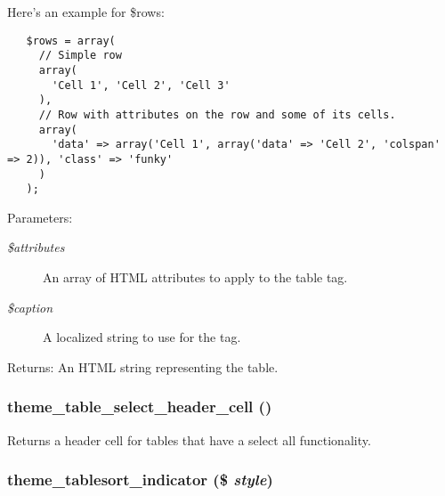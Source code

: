 Here's an example for \$rows: 

\begin{Code}\begin{verbatim}   $rows = array(
     // Simple row
     array(
       'Cell 1', 'Cell 2', 'Cell 3'
     ),
     // Row with attributes on the row and some of its cells.
     array(
       'data' => array('Cell 1', array('data' => 'Cell 2', 'colspan' => 2)), 'class' => 'funky'
     )
   );
\end{verbatim}
\end{Code}



\begin{Desc}
\item[Parameters:]
\begin{description}
\item[{\em \$attributes}]An array of HTML attributes to apply to the table tag. \item[{\em \$caption}]A localized string to use for the  tag. \end{description}
\end{Desc}
\begin{Desc}
\item[Returns:]An HTML string representing the table. \end{Desc}
\hypertarget{group__themeable_ge2a1acba9910db3b633eb9339b39d65d}{
\subsubsection[{theme\_\-table\_\-select\_\-header\_\-cell}]{\setlength{\rightskip}{0pt plus 5cm}theme\_\-table\_\-select\_\-header\_\-cell ()}}
\label{group__themeable_ge2a1acba9910db3b633eb9339b39d65d}


Returns a header cell for tables that have a select all functionality. \hypertarget{group__themeable_ga114475e1c769831776ae8af627595bc}{
\subsubsection[{theme\_\-tablesort\_\-indicator}]{\setlength{\rightskip}{0pt plus 5cm}theme\_\-tablesort\_\-indicator (\$ {\em style})}}
\label{group__themeable_ga114475e1c769831776ae8af627595bc}


